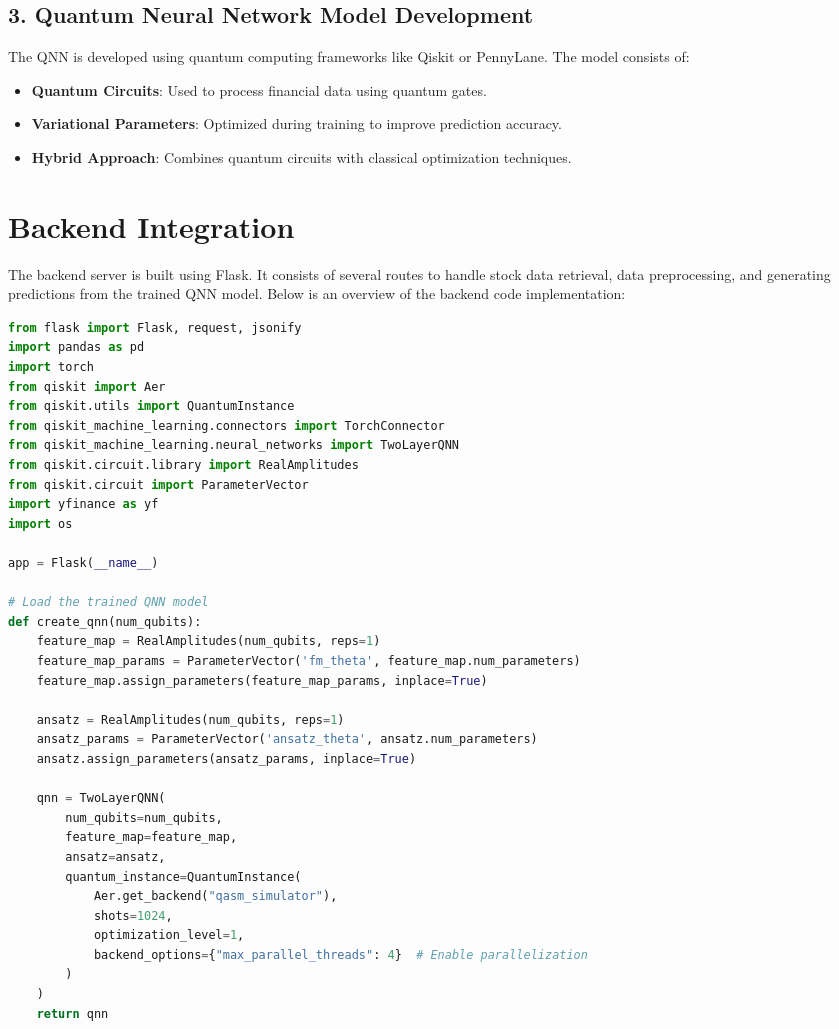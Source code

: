 \documentclass[12pt]{article}
\begin{document}
\begin{multicols}{2}
\subsection{3. Quantum Neural Network Model Development}
The QNN is developed using quantum computing frameworks like Qiskit or PennyLane. The model consists of:
\begin{itemize}
    \item \textbf{Quantum Circuits}: Used to process financial data using quantum gates.
    \item \textbf{Variational Parameters}: Optimized during training to improve prediction accuracy.
    \item \textbf{Hybrid Approach}: Combines quantum circuits with classical optimization techniques.
\end{itemize}

\section{Backend Integration}
The backend server is built using Flask. It consists of several routes to handle stock data retrieval, data preprocessing, and generating predictions from the trained QNN model. Below is an overview of the backend code implementation:

\begin{lstlisting}[language=Python, caption=Flask Backend for QNN Prediction]
from flask import Flask, request, jsonify
import pandas as pd
import torch
from qiskit import Aer
from qiskit.utils import QuantumInstance
from qiskit_machine_learning.connectors import TorchConnector
from qiskit_machine_learning.neural_networks import TwoLayerQNN
from qiskit.circuit.library import RealAmplitudes
from qiskit.circuit import ParameterVector
import yfinance as yf
import os

app = Flask(__name__)

# Load the trained QNN model
def create_qnn(num_qubits):
    feature_map = RealAmplitudes(num_qubits, reps=1)
    feature_map_params = ParameterVector('fm_theta', feature_map.num_parameters)
    feature_map.assign_parameters(feature_map_params, inplace=True)

    ansatz = RealAmplitudes(num_qubits, reps=1)
    ansatz_params = ParameterVector('ansatz_theta', ansatz.num_parameters)
    ansatz.assign_parameters(ansatz_params, inplace=True)

    qnn = TwoLayerQNN(
        num_qubits=num_qubits,
        feature_map=feature_map,
        ansatz=ansatz,
        quantum_instance=QuantumInstance(
            Aer.get_backend("qasm_simulator"),
            shots=1024,
            optimization_level=1,
            backend_options={"max_parallel_threads": 4}  # Enable parallelization
        )
    )
    return qnn


\end{lstlisting}
\end{multicols}
\end{document}

